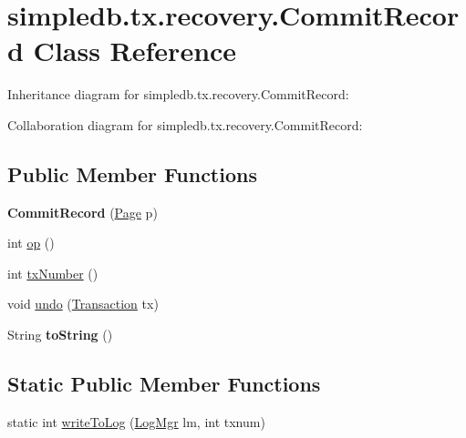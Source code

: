 \hypertarget{classsimpledb_1_1tx_1_1recovery_1_1CommitRecord}{}\section{simpledb.\+tx.\+recovery.\+Commit\+Record Class Reference}
\label{classsimpledb_1_1tx_1_1recovery_1_1CommitRecord}


Inheritance diagram for simpledb.\+tx.\+recovery.\+Commit\+Record\+:


Collaboration diagram for simpledb.\+tx.\+recovery.\+Commit\+Record\+:
\subsection*{Public Member Functions}
\begin{DoxyCompactItemize}
\item 
\mbox{\label{classsimpledb_1_1tx_1_1recovery_1_1CommitRecord_a2ef1fe40555b29dd1aa617fe23f0be8c}} 
{\bfseries Commit\+Record} (\hyperlink{classsimpledb_1_1file_1_1Page}{Page} p)
\item 
int \hyperlink{classsimpledb_1_1tx_1_1recovery_1_1CommitRecord_a4a550ab6247f33e349b3edff767bc630}{op} ()
\item 
int \hyperlink{classsimpledb_1_1tx_1_1recovery_1_1CommitRecord_a9e644845f0e04b1c9c0fae4d9cdbe618}{tx\+Number} ()
\item 
void \hyperlink{classsimpledb_1_1tx_1_1recovery_1_1CommitRecord_aa7a60156e7d7dfb10d2e6f8e4496f756}{undo} (\hyperlink{classsimpledb_1_1tx_1_1Transaction}{Transaction} tx)
\item 
\mbox{\label{classsimpledb_1_1tx_1_1recovery_1_1CommitRecord_a370bf526e1a97f59a847d822e11e3ce0}} 
String {\bfseries to\+String} ()
\end{DoxyCompactItemize}
\subsection*{Static Public Member Functions}
\begin{DoxyCompactItemize}
\item 
static int \hyperlink{classsimpledb_1_1tx_1_1recovery_1_1CommitRecord_a5170a623502e3c852ef3fb0fd76d3bde}{write\+To\+Log} (\hyperlink{classsimpledb_1_1log_1_1LogMgr}{Log\+Mgr} lm, int txnum)
\end{DoxyCompactItemize}
